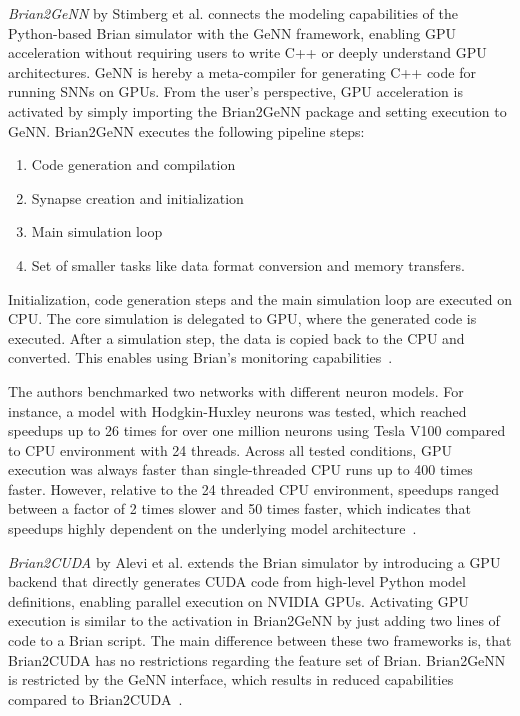 \textit{Brian2GeNN} by Stimberg et al. connects the modeling capabilities of the Python-based Brian simulator with the GeNN framework, enabling \ac{GPU} acceleration without requiring users to write C++ or deeply understand \ac{GPU} architectures. 
GeNN is hereby a meta-compiler for generating C++ code for running \acp{SNN} on \acp{GPU}.
From the user's perspective, \ac{GPU} acceleration is activated by simply importing the Brian2GeNN package and setting execution to GeNN. 
Brian2GeNN executes the following pipeline steps:
\begin{enumerate}
    \item Code generation and compilation
    \item Synapse creation and initialization
    \item Main simulation loop
    \item Set of smaller tasks like data format conversion and memory transfers.
\end{enumerate}
Initialization, code generation steps and the main simulation loop are executed on \ac{CPU}.
The core simulation is delegated to \ac{GPU}, where the generated code is executed.
After a simulation step, the data is copied back to the \ac{CPU} and converted.
This enables using Brian's monitoring capabilities~\cite{stimberg_brian2genn_2020}. 

The authors benchmarked two networks with different neuron models.
For instance, a model with Hodgkin-Huxley neurons was tested, which reached speedups up to 26 times for over one million neurons using Tesla V100 compared to \ac{CPU} environment with 24 threads.
Across all tested conditions, \ac{GPU} execution was always faster than single-threaded CPU runs up to 400 times faster.
However, relative to the 24 threaded \ac{CPU} environment, speedups ranged between a factor of 2 times slower and 50 times faster, which indicates that speedups highly dependent on the underlying model architecture~\cite{stimberg_brian2genn_2020}. 

\textit{Brian2CUDA} by Alevi et al. extends the Brian simulator by introducing a \ac{GPU} backend that directly generates CUDA code from high-level Python model definitions, enabling parallel execution on NVIDIA \acp{GPU}. 
Activating \ac{GPU} execution is similar to the activation in Brian2GeNN by just adding two lines of code to a Brian script. 
The main difference between these two frameworks is, that Brian2CUDA has no restrictions regarding the feature set of Brian.
Brian2GeNN is restricted by the GeNN interface, which results in reduced capabilities compared to Brian2CUDA~\cite{alevi_brian2cuda_2022}.

